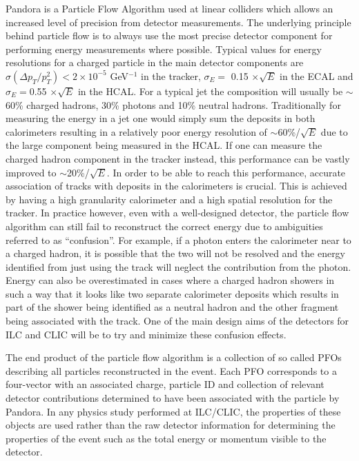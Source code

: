 Pandora\cite{Thomson200925} is a Particle Flow Algorithm used at linear colliders which allows an increased level of precision from detector measurements. The underlying principle behind particle flow is to always use the most precise detector component for performing energy measurements where possible. Typical values for energy resolutions for a charged particle in the main detector components are $\sigma(\Delta p_T/ p_{T}^2) < 2 \times 10^{-5}$ GeV$^{-1}$ in the tracker, $\sigma_E =$ 0.15 $\times \sqrt{E}$ in the \ac{ECAL} and $\sigma_E =$0.55 $\times \sqrt{E}$ in the \ac{HCAL}. For a typical jet the composition will usually be $\sim$60\% charged hadrons, 30\% photons and 10\% neutral hadrons. Traditionally for measuring the energy in a jet one would simply sum the deposits in both calorimeters resulting in a relatively poor energy resolution of $\sim$60\%/$\sqrt{E}$ due to the large component being measured in the \ac{HCAL}. If one can measure the charged hadron component in the tracker instead, this performance can be vastly improved to $\sim$20\%/$\sqrt{E}$. In order to be able to reach this performance, accurate association of tracks with deposits in the calorimeters is crucial. This is achieved by having a high granularity calorimeter and a high spatial resolution for the tracker. In practice however, even with a well-designed detector, the particle flow algorithm can still fail to reconstruct the correct energy due to ambiguities referred to as ``confusion''. For example, if a photon enters the calorimeter near to a charged hadron, it is possible that the two will not be resolved and the energy identified from just using the track will neglect the contribution from the photon. Energy can also be overestimated in cases where a charged hadron showers in such a way that it looks like two separate calorimeter deposits which results in part of the shower being identified as a neutral hadron and the other fragment being associated with the track. One of the main design aims of the detectors for \ac{ILC} and \ac{CLIC} will be to try and minimize these confusion effects.

The end product of the particle flow algorithm is a collection of so called \ac{PFO}s describing all particles reconstructed in the event. Each \ac{PFO} corresponds to a four-vector with an associated charge, particle ID and collection of relevant detector contributions determined to have been associated with the particle by Pandora. In any physics study performed at \ac{ILC}/\ac{CLIC}, the properties of these objects are used rather than the raw detector information for determining the properties of the event such as the total energy or momentum visible to the detector.


